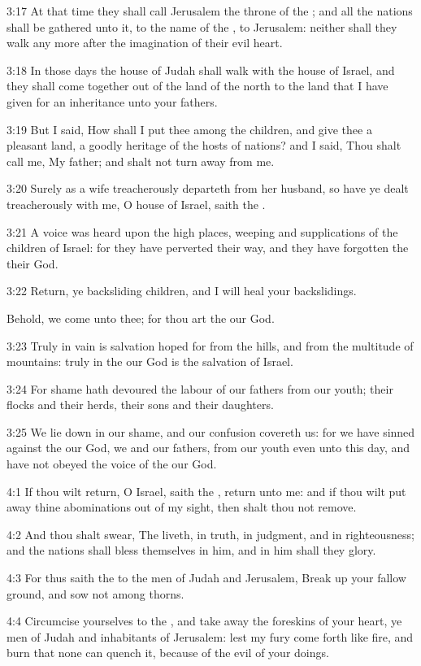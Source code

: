 3:17 At that time they shall call Jerusalem the throne of the \LORD;
and all the nations shall be gathered unto it, to the name of the
\LORD, to Jerusalem: neither shall they walk any more after the
imagination of their evil heart.

3:18 In those days the house of Judah shall walk with the house of
Israel, and they shall come together out of the land of the north to
the land that I have given for an inheritance unto your fathers.

3:19 But I said, How shall I put thee among the children, and give
thee a pleasant land, a goodly heritage of the hosts of nations? and I
said, Thou shalt call me, My father; and shalt not turn away from me.

3:20 Surely as a wife treacherously departeth from her husband, so
have ye dealt treacherously with me, O house of Israel, saith the
\LORD.

3:21 A voice was heard upon the high places, weeping and supplications
of the children of Israel: for they have perverted their way, and they
have forgotten the \LORD their God.

3:22 Return, ye backsliding children, and I will heal your
backslidings.

Behold, we come unto thee; for thou art the \LORD our God.

3:23 Truly in vain is salvation hoped for from the hills, and from the
multitude of mountains: truly in the \LORD our God is the salvation of
Israel.

3:24 For shame hath devoured the labour of our fathers from our youth;
their flocks and their herds, their sons and their daughters.

3:25 We lie down in our shame, and our confusion covereth us: for we
have sinned against the \LORD our God, we and our fathers, from our
youth even unto this day, and have not obeyed the voice of the \LORD
our God.

4:1 If thou wilt return, O Israel, saith the \LORD, return unto me: and
if thou wilt put away thine abominations out of my sight, then shalt
thou not remove.

4:2 And thou shalt swear, The \LORD liveth, in truth, in judgment, and
in righteousness; and the nations shall bless themselves in him, and
in him shall they glory.

4:3 For thus saith the \LORD to the men of Judah and Jerusalem, Break
up your fallow ground, and sow not among thorns.

4:4 Circumcise yourselves to the \LORD, and take away the foreskins of
your heart, ye men of Judah and inhabitants of Jerusalem: lest my fury
come forth like fire, and burn that none can quench it, because of the
evil of your doings.

